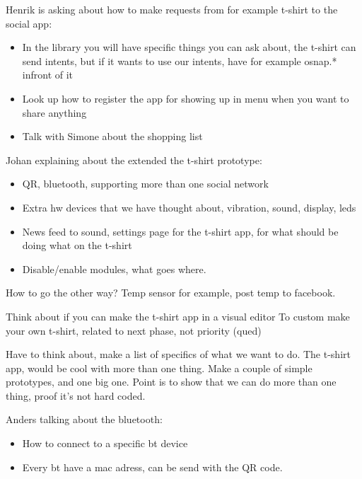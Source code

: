 Henrik is asking about how to make requests from for example t-shirt to the social app:
\begin{itemize}
\item In the library you will have specific things you can ask about, the t-shirt can send intents, but if it wants to use our intents, have for example osnap.* infront of it
\item Look up how to register the app for showing up in menu when you want to share anything
\item Talk with Simone about the shopping list
\end{itemize}

Johan explaining about the extended the t-shirt prototype:
\begin{itemize}
\item QR, bluetooth, supporting more than one social network
\item Extra hw devices that we have thought about, vibration, sound, display, leds
\item News feed to sound, settings page for the t-shirt app, for what should be doing what on the t-shirt
\item Disable/enable modules, what goes where.
\end{itemize}

How to go the other way? \newline
Temp sensor for example, post temp to facebook.
  
Think about if you can make the t-shirt app in a visual editor \newline
To custom make your own t-shirt, related to next phase, not priority (qued)

Have to think about, make a list of specifics of what we want to do. \newline
The t-shirt app, would be cool with more than one thing. Make a couple of simple prototypes, and one big one.
Point is to show that we can do more than one thing, proof it's not hard coded.

Anders talking about the bluetooth:
\begin{itemize}
\item How to connect to a specific bt device
\item Every bt have a mac adress, can be send with the QR code.
\end{itemize}

